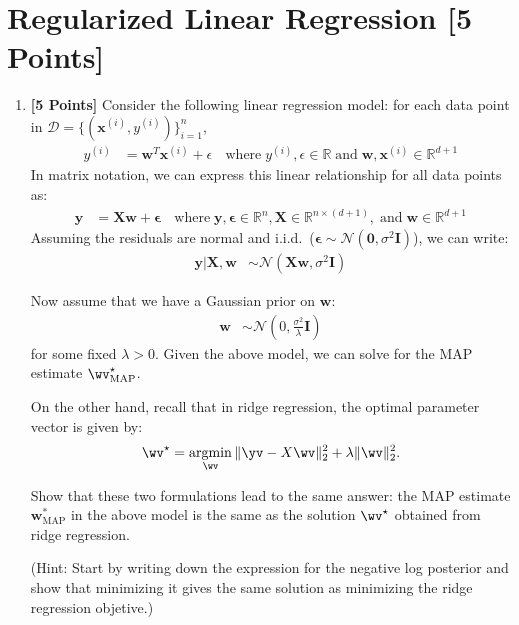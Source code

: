 \section{Regularized Linear Regression [5 Points]}

\begin{enumerate}

\item {\bf [5 Points]} Consider the following linear regression model: for each data point in $\mathcal{D} = \{(\bm{x}^{(i)}, y^{(i)})\}_{i=1}^n$,
\begin{align}
    y^{(i)} &= \bm{w}^T \bm{x}^{(i)} + \epsilon\; \text{~~where}\; y^{(i)}, \epsilon \in \mathbb{R}\; \text{and}\; \bm{w}, \bm{x}^{(i)} \in \mathbb{R}^{d+1} \nonumber
\end{align}
In matrix notation, we can express this linear relationship for all data points as:
\begin{align}
    \bm{y} &= \bm{X}\bm{w} + \bm{\epsilon}\; \text{~~where}\; \bm{y}, \bm{\epsilon} \in \mathbb{R}^n, \bm{X} \in \mathbb{R}^{n \times (d+1)},\; \text{and}\; \bm{w} \in \mathbb{R}^{d+1} \nonumber
\end{align}
Assuming the residuals are normal and i.i.d.\ ($\bm{\epsilon} \sim \mathcal{N}(\bm{0}, \sigma^2 \bm{I})$), we can write:
\begin{align}
    \bm{y}|\bm{X},\bm{w} &\sim \mathcal{N}(\bm{X}\bm{w}, \sigma^2 \bm{I}) \nonumber
\end{align}

Now assume that we have a Gaussian prior on $\bm{w}$:
\begin{align}
    \bm{w} &\sim \mathcal{N}\left(0,\frac{\sigma^2}{\lambda}\bm{I}\right) \nonumber
\end{align}
for some fixed $\lambda > 0$. Given the above model, we can solve for the MAP estimate $\wv^\star_{\rm MAP}$.

On the other hand, recall that in ridge regression, the optimal parameter vector is given by:
\begin{align}
\wv^\star = \argmin_{\wv} \|\yv - X\wv\|_2^2 + \lambda \|\wv\|_2^2. \nonumber
\end{align}

Show that these two formulations lead to the same answer: the MAP estimate $\bm{w}^*_{\text{MAP}}$ in the above model is the same as the solution $\wv^\star$ obtained from ridge regression.

(Hint: Start by writing down the expression for the negative log posterior and show that minimizing it gives the same solution as minimizing the ridge regression objetive.)

\begin{tcolorbox}[fit,height=10cm, width=0.95\textwidth, blank, borderline={1pt}{-2pt}]
\end{tcolorbox}


\end{enumerate}
